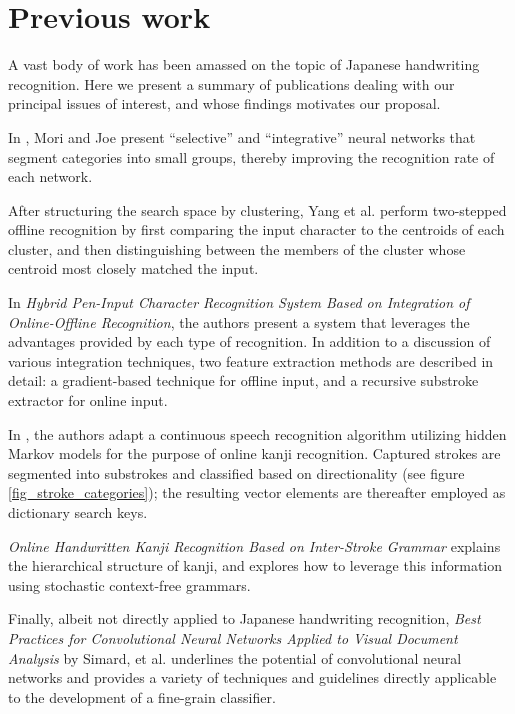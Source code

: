 \documentclass[10pt,conference,a4paper]{IEEEtran}
\begin{document}
	\section{Previous work}
	\label{sec:previous_work}

	A vast body of work has been amassed on the topic of Japanese handwriting recognition.
	Here we present a summary of publications dealing with our principal issues of interest,
	and whose findings motivates our proposal.


	In \cite{joe1989large}, Mori and Joe present ``selective'' and ``integrative'' neural networks that 
	segment categories into small groups, thereby improving the recognition rate of each network.

	
	After structuring the search space by clustering, Yang et al. perform two-stepped offline recognition by first
	comparing the input character to the centroids of each cluster, and then distinguishing between the members of the cluster
	whose centroid most closely matched the input. \cite{yang2003accelerating}


	In \emph{Hybrid Pen-Input Character Recognition System Based on Integration of Online-Offline Recognition},
	the authors present a system that leverages the advantages provided by each type of recognition.
	In addition to a discussion of various integration techniques, two feature extraction methods are described in detail: 
	a gradient-based technique for offline input, and a recursive substroke extractor for online input.


	In \cite{nakai2001substroke}, the authors adapt a continuous speech recognition algorithm utilizing
	hidden Markov models for the purpose of online kanji recognition. Captured strokes are segmented into
	substrokes and classified based on directionality (see figure \ref{fig_stroke_categories});
	the resulting vector elements are thereafter employed as dictionary search keys.


	\emph{Online Handwritten Kanji Recognition Based on Inter-Stroke Grammar} explains the hierarchical structure of kanji,
	and explores how to leverage this information using stochastic context-free grammars. \cite{ota2007online}

	Finally, albeit not directly applied to Japanese handwriting recognition, \emph{Best Practices for Convolutional Neural Networks
	Applied to Visual Document Analysis} by Simard, et al. underlines the potential of convolutional neural networks 
	and provides a variety of techniques and guidelines directly applicable to the development of a fine-grain classifier. \cite{simard2003best}
\end{document}
